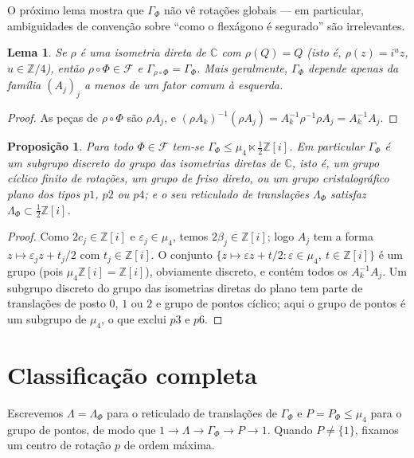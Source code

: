 \documentclass[11pt,a4paper]{article}
\theoremstyle{plain}
\newtheorem{proposicao}[teorema]{Proposição}
\newtheorem{lema}[teorema]{Lema}
\theoremstyle{definition}
\theoremstyle{remark}
\newcommand{\C}{\mathbb{C}}
\newcommand{\Z}{\mathbb{Z}}
\newcommand{\Zi}{\Z[i]}
\newcommand{\FF}{\mathscr{F}}
\begin{document}
O próximo lema mostra que $\Gamma_\Phi$ não vê rotações globais --- em
particular, ambiguidades de convenção sobre ``como o flexágono é segurado''
são irrelevantes.

\begin{lema}\label{lem:rho}
Se $\rho$ é uma isometria direta de $\C$ com $\rho(Q)=Q$ (isto é,
$\rho(z)=i^u z$, $u\in\Z/4$), então $\rho\circ\Phi\in\FF$ e
$\Gamma_{\rho\circ\Phi}=\Gamma_\Phi$. Mais geralmente,
$\Gamma_\Phi$ depende apenas da família $(A_j)_j$ a menos de um fator comum
à esquerda.
\end{lema}

\begin{proof}
As peças de $\rho\circ\Phi$ são $\rho A_j$, e
$(\rho A_k)^{-1}(\rho A_j)=A_k^{-1}\rho^{-1}\rho A_j=A_k^{-1}A_j$.
\end{proof}

\begin{proposicao}\label{prop:discreto}
Para todo $\Phi\in\FF$ tem-se
$\Gamma_\Phi\le \mu_4\ltimes\tfrac12\Zi$. Em particular $\Gamma_\Phi$ é um
subgrupo discreto do grupo das isometrias diretas de $\C$, isto é, um grupo
cíclico finito de rotações, um grupo de friso direto, ou um grupo
cristalográfico plano dos tipos $p1$, $p2$ ou $p4$; e o seu reticulado de
translações $\Lambda_\Phi$ satisfaz $\Lambda_\Phi\subset\frac12\Zi$.
\end{proposicao}

\begin{proof}
Como $2c_j\in\Zi$ e $\varepsilon_j\in\mu_4$, temos $2\beta_j\in\Zi$; logo
$A_j$ tem a forma $z\mapsto \varepsilon_j z+t_j/2$ com $t_j\in\Zi$. O conjunto
$\{z\mapsto \varepsilon z+t/2:\varepsilon\in\mu_4,\ t\in\Zi\}$ é um grupo
(pois $\mu_4\Zi=\Zi$), obviamente discreto, e contém todos os $A_k^{-1}A_j$.
Um subgrupo discreto do grupo das isometrias diretas do plano tem parte de
translações de posto $0$, $1$ ou $2$ e grupo de pontos cíclico; aqui o grupo de
pontos é um subgrupo de $\mu_4$, o que exclui $p3$ e $p6$.
\end{proof}

\section{Classificação completa}\label{sec:classificacao}

Escrevemos $\Lambda=\Lambda_\Phi$ para o reticulado de translações de
$\Gamma_\Phi$ e $P=P_\Phi\le\mu_4$ para o grupo de pontos, de modo que
$1\to\Lambda\to\Gamma_\Phi\to P\to 1$. Quando $P\ne\{1\}$, fixamos um centro de
rotação $p$ de ordem máxima.
\end{document}
